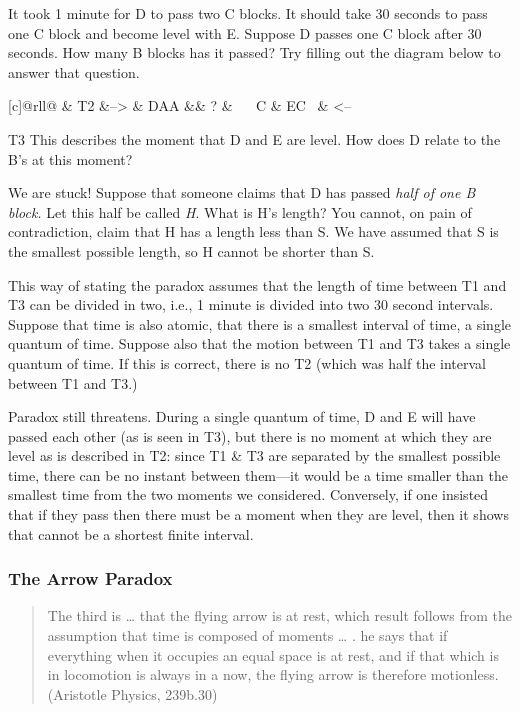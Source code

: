 \documentclass[]{article}
\begin{document}
It took 1 minute for D to pass two C blocks. It should take 30 seconds
to pass one C block and become level with E. Suppose D passes one C
block after 30 seconds. How many B blocks has it passed? Try filling out
the diagram below to answer that question.

{[}c{]}{@rll@} \& T2 \&--\textgreater{} \& DAA \&\& ? \&~ ~ C \& EC~ \&
\textless{}--

T3 This describes the moment that D and E are level. How does D relate
to the B's at this moment?

We are stuck! Suppose that someone claims that D has passed \emph{half
of one B block.} Let this half be called \emph{H}. What is H's length?
You cannot, on pain of contradiction, claim that H has a length less
than S. We have assumed that S is the smallest possible length, so H
cannot be shorter than S.

This way of stating the paradox assumes that the length of time between
T1 and T3 can be divided in two, i.e., 1 minute is divided into two 30
second intervals. Suppose that time is also atomic, that there is a
smallest interval of time, a single quantum of time. Suppose also that
the motion between T1 and T3 takes a single quantum of time. If this is
correct, there is no T2 (which was half the interval between T1 and T3.)

Paradox still threatens. During a single quantum of time, D and E will
have passed each other (as is seen in T3), but there is no moment at
which they are level as is described in T2: since T1 \& T3 are separated
by the smallest possible time, there can be no instant between them---it
would be a time smaller than the smallest time from the two moments we
considered. Conversely, if one insisted that if they pass then there
must be a moment when they are level, then it shows that cannot be a
shortest finite interval.

\subsubsection{The Arrow Paradox}\label{the-arrow-paradox}

\begin{quote}
The third is \ldots{} that the flying arrow is at rest, which result
follows from the assumption that time is composed of moments \ldots{} .
he says that if everything when it occupies an equal space is at rest,
and if that which is in locomotion is always in a now, the flying arrow
is therefore motionless. (Aristotle Physics, 239b.30)
\end{quote}
\end{document}
